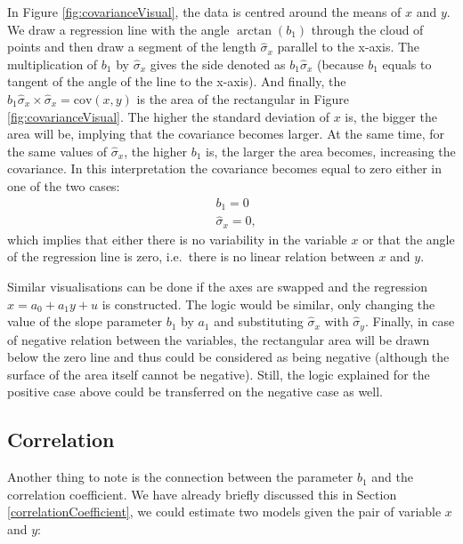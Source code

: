 \documentclass[
]{book}
\theoremstyle{definition}
\theoremstyle{definition}
\theoremstyle{definition}
\theoremstyle{definition}
\theoremstyle{remark}
\begin{document}
In Figure \ref{fig:covarianceVisual}, the data is centred around the means of \(x\) and \(y\). We draw a regression line with the angle \(\arctan (b_1)\) through the cloud of points and then draw a segment of the length \(\hat{\sigma}_x\) parallel to the x-axis. The multiplication of \(b_1\) by \(\hat{\sigma}_x\) gives the side denoted as \(b_1 \hat{\sigma}_x\) (because \(b_1\) equals to tangent of the angle of the line to the x-axis). And finally, the \(b_1 \hat{\sigma}_x \times \hat{\sigma}_x = \mathrm{cov}(x,y)\) is the area of the rectangular in Figure \ref{fig:covarianceVisual}. The higher the standard deviation of \(x\) is, the bigger the area will be, implying that the covariance becomes larger. At the same time, for the same values of \(\hat{\sigma}_x\), the higher \(b_1\) is, the larger the area becomes, increasing the covariance. In this interpretation the covariance becomes equal to zero either in one of the two cases:
\begin{equation*}
    \begin{aligned}
        & {b}_1 = 0 \\
        & \hat{\sigma}_x =0 ,
    \end{aligned}
\end{equation*}
which implies that either there is no variability in the variable \(x\) or that the angle of the regression line is zero, i.e.~there is no linear relation between \(x\) and \(y\).

Similar visualisations can be done if the axes are swapped and the regression \(x = a_0 + a_1 y + u\) is constructed. The logic would be similar, only changing the value of the slope parameter \(b_1\) by \(a_1\) and substituting \(\hat{\sigma}_x\) with \(\hat{\sigma}_y\). Finally, in case of negative relation between the variables, the rectangular area will be drawn below the zero line and thus could be considered as being negative (although the surface of the area itself cannot be negative). Still, the logic explained for the positive case above could be transferred on the negative case as well.

\hypertarget{correlation}{%
\subsection{Correlation}\label{correlation}}

Another thing to note is the connection between the parameter \({b}_1\) and the correlation coefficient. We have already briefly discussed this in Section \ref{correlationCoefficient}, we could estimate two models given the pair of variable \(x\) and \(y\):
\end{document}
